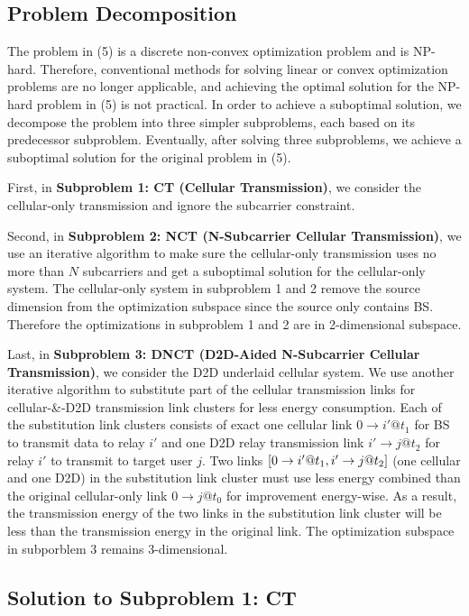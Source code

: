 \documentclass{ieeeaccess}
\begin{document}
\subsection{Problem Decomposition}

The problem in (5) is a discrete non-convex optimization problem and is NP-hard. Therefore, conventional methods for solving linear or convex optimization problems are no longer applicable, and achieving the optimal solution for the NP-hard problem in (5) is not practical. 
In order to achieve a suboptimal solution, we decompose the problem into three simpler subproblems, each based on its predecessor subproblem. Eventually, after solving three subproblems, we achieve a suboptimal solution for the original problem in (5).

First, in \textbf{Subproblem 1: CT (Cellular Transmission)}, we consider the cellular-only transmission and ignore the subcarrier constraint. 

Second, in \textbf{Subproblem 2: NCT (N-Subcarrier Cellular Transmission)}, we use an iterative algorithm to make sure the cellular-only transmission uses no more than $N$ subcarriers and get a suboptimal solution for the cellular-only system. The cellular-only system in subproblem 1 and 2 remove the source dimension from the optimization subspace since the source only contains BS. Therefore the optimizations in subproblem 1 and 2 are in 2-dimensional subspace.

Last, in \textbf{Subproblem 3: DNCT (D2D-Aided N-Subcarrier Cellular Transmission)}, we consider the D2D underlaid cellular system. We use another iterative algorithm to substitute part of the cellular transmission links for cellular-\&-D2D transmission link clusters for less energy consumption. Each of the substitution link clusters consists of exact one cellular link $0 \to i'@{t_1}$ for BS to transmit data to relay ${i'}$ and one D2D relay transmission link $i' \to j@{t_2}$ for relay ${i'}$ to transmit to target user $j$. Two links $\left[ {{\rm{0}} \to i'@{t_1},i' \to j@{t_2}} \right]$ (one cellular and one D2D) in the substitution link cluster must use less energy combined than the original cellular-only link $0 \to j@{t_0}$ for improvement energy-wise. As a result, the transmission energy of the two links in the substitution link cluster will be less than the transmission energy in the original link. The optimization subspace in subporblem 3 remains 3-dimensional.

\subsection{Solution to \textbf{Subproblem 1: CT}}
\end{document}

